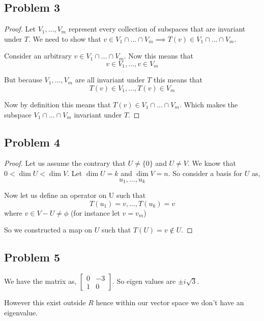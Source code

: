 \documentclass[a4paper]{report}
\begin{document}
\subsection*{Problem 3}
\begin{proof}
Let $V_1,\dots,V_m$ represent every collection of subspaces that are invariant under $T$. We need to show that $v \in V_1 \cap \dots \cap V_m \implies T(v) \in V_1 \cap \dots \cap V_m$. 

Consider an arbitrary $v \in V_1 \cap\dots \cap V_m$. Now this means that 
$$ v \in V_1, \dots, v \in V_m $$ 

But because $V_1,\dots,V_m$ are all invariant under $T$ this means that 
$$ T(v) \in V_1,\dots ,T(v) \in V_m $$

Now by definition this means that $T(v) \in V_1 \cap \dots \cap V_m$. Which makes the subspace $V_1 \cap \dots  \cap V_m$ invariant under $T$.
\end{proof}


\subsection*{Problem 4}
\begin{proof}
   Let us assume the contrary that $U \ne \{0\}$ and  $U \ne V$. We know that  $0 < \dim U < \dim V$. Let $\dim U = k$ and $\dim V = n$. So consider a basis for $U$ as, 
   $$ u_1,\dots,u_k $$ 


   Now let us define an operator on U such that  
   $$ T(u_1) = v, \dots, T(u_k) = v $$ where $v \in V- U \ne \phi$ (for instance let  $v = v_m$)

   So we constructed a map on  $U$ such that $T(U) = v \not \in U$.
   
\end{proof}


\subsection*{Problem 5}
We have the matrix as, $ \begin{bmatrix} 0 & -3 \\ 1 & 0  \end{bmatrix}$. So eigen values are $\pm i \sqrt{3}$. 

However this exist outside  $R$ hence within our vector space we don't have an eigenvalue.
\end{document}
